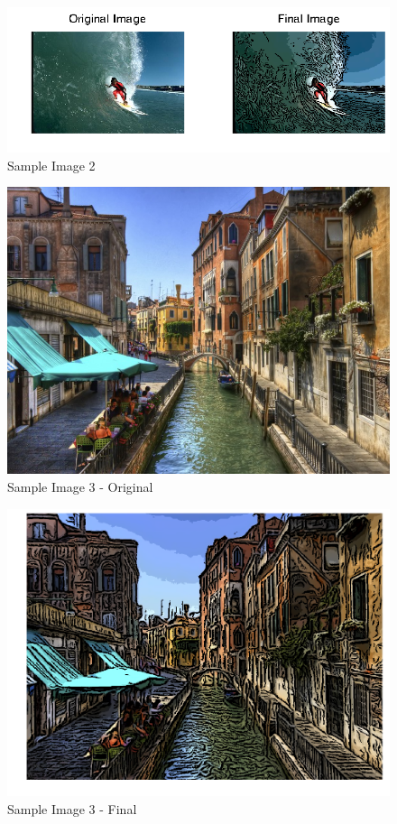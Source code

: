 \documentclass[a4paper]{article}
\begin{document}
\begin{figure}
\centering
\includegraphics[width=1\textwidth]{300091_final.png}
\caption{Sample Image 2}
\end{figure}
\begin{figure}
\centering
\includegraphics[width=1\textwidth]{narrow_canal.jpg}
\caption{Sample Image 3 - Original}
\end{figure}
\begin{figure}
\centering
\includegraphics[width=1\textwidth]{narrow_canal_final.png}
\caption{Sample Image 3 - Final}
\end{figure}
\end{document}
